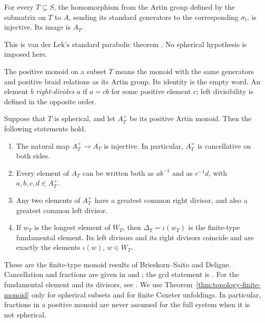 \begin{theorem}
\label{thm:topology-parabolic-embedding}
For every $T\subseteq S$, the homomorphism from the Artin group defined
by the submatrix on $T$ to $A$, sending its standard generators to the
corresponding $\sigma_t$, is injective.  Its image is $A_T$.
\end{theorem}

This is van der Lek's standard parabolic theorem
\cite[Chapter II, Section 4, Theorem 4.13(i)]{VanDerLek1983}.
No spherical hypothesis is imposed here.

The positive monoid on a subset $T$ means the monoid with the same
generators and positive braid relations as its Artin group.  Its
identity is the empty word.  An element $b$ \emph{right-divides} $a$
if $a=cb$ for some positive element $c$; left divisibility is defined
in the opposite order.

\begin{theorem}
\label{thm:topology-finite-monoid}
Suppose that $T$ is spherical, and let $A_T^+$ be its positive Artin
monoid.  Then the following statements hold.
\begin{enumerate}[label=\textup{(\roman*)}]
  \item The natural map $A_T^+\to A_T$ is injective.  In particular,
    $A_T^+$ is cancellative on both sides.
  \item Every element of $A_T$ can be written both as $ab^{-1}$ and
    as $c^{-1}d$, with $a,b,c,d\in A_T^+$.
  \item Any two elements of $A_T^+$ have a greatest common right
    divisor, and also a greatest common left divisor.
  \item If $w_T$ is the longest element of $W_T$, then
    $\Delta_T=\iota(w_T)$ is the finite-type fundamental element.
    Its left divisors and its right divisors coincide and are exactly
    the elements $\iota(w)$, $w\in W_T$.
\end{enumerate}
\end{theorem}

These are the finite-type monoid results of Brieskorn--Saito and
Deligne.  Cancellation and fractions are given in
\cite[Propositions 2.3 and 5.5(iii)--(iv), and Theorem 5.6]{BrieskornSaito1972} and
\cite[Theorem 4.14]{Deligne1972}; the gcd statement is
\cite[Proposition 4.2]{BrieskornSaito1972}.  For the fundamental
element and its divisors, see
\cite[Lemma 5.4 and Propositions 5.5 and 5.7]{BrieskornSaito1972}.
We use Theorem~\ref{thm:topology-finite-monoid} only for spherical
subsets and for finite Coxeter unfoldings.  In particular, fractions
in a positive monoid are never assumed for the full system when it
is not spherical.

